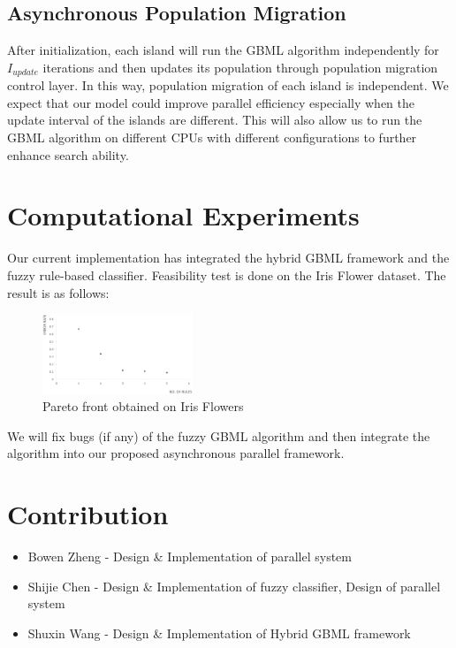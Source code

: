 \documentclass[conference]{IEEEtran}
\begin{document}
  \subsection{Asynchronous Population Migration}
  After initialization, each island will run the GBML algorithm independently for $I_{update}$ iterations and then updates its population through population migration control layer. In this way, population migration of each island is independent. We expect that our model could improve parallel efficiency especially when the update interval of the islands are different. This will also allow us to run the GBML algorithm on different CPUs with different configurations to further enhance search ability.
  
  
  \section{Computational Experiments}

	 Our current implementation has integrated the hybrid GBML framework and the fuzzy rule-based classifier. Feasibility test is done on the Iris Flower dataset. The result is as follows:

 \begin{figure}[H]
 	\centering
 	\includegraphics[width=0.4\textwidth]{figures/iris.png}
 	\caption{Pareto front obtained on Iris Flowers}\label{fig:digit}
 \end{figure}

 We will fix bugs (if any) of the fuzzy GBML algorithm and then integrate the algorithm into our proposed asynchronous parallel framework. 

  \section{Contribution}
  
    \begin{itemize}
    \item Bowen Zheng - Design \& Implementation of parallel system
    \item Shijie Chen - Design \& Implementation of fuzzy classifier, Design of parallel system
    \item Shuxin Wang - Design \& Implementation of Hybrid GBML framework
    \end{itemize}
    





\end{document}
